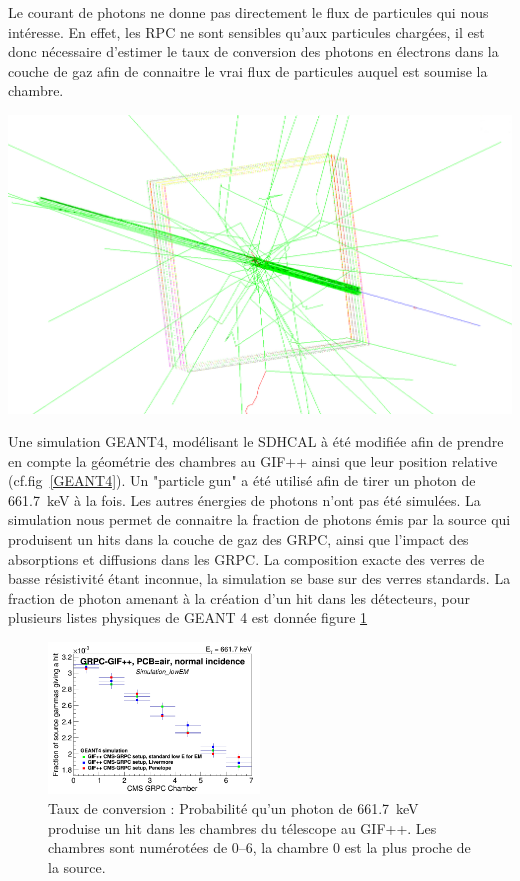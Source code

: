 Le courant de photons ne donne pas directement le flux de particules qui nous intéresse. En effet, les RPC ne sont sensibles qu'aux particules chargées, il est donc nécessaire d'estimer le taux de conversion des photons en électrons dans la couche de gaz afin de connaitre le vrai flux de particules auquel est soumise la chambre. 


\marginpar
{
	\centering
	\includegraphics[width=\marginparwidth]{GLA/geant4.png}
	\label{GEANT4}
}

Une simulation GEANT4, modélisant le SDHCAL à été modifiée afin de prendre en compte la géométrie des chambres au GIF++ ainsi que leur position relative (cf.fig~\ref{GEANT4}). Un "particle gun" a été utilisé afin de tirer un photon de \SI{661.7}{\kilo\eV} à la fois. Les autres énergies de photons n'ont pas été simulées. La simulation nous permet de connaitre la fraction de photons émis par la source qui produisent un hits dans la couche de gaz des GRPC, ainsi que l'impact des absorptions et diffusions dans les GRPC. La composition exacte des verres de basse résistivité étant inconnue, la simulation se base sur des verres standards. La fraction de photon amenant à la création d'un hit dans les détecteurs, pour plusieurs listes physiques de GEANT 4 est donnée figure \ref{conversion}

\begin{figure}[!ht]
	\centering
	\includegraphics[width=0.50\textwidth]{GLA/taux.png}
	\caption{Taux de conversion : Probabilité qu'un photon de \SI{661.7}{\kilo\eV} produise un hit dans les chambres du télescope au GIF++. Les chambres sont numérotées de \SIrange{0}{6}{}, la chambre \num{0} est la plus proche de la source.}
	\label{conversion}
\end{figure}


